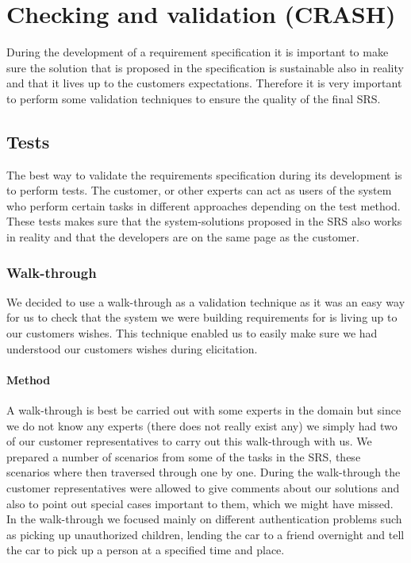 \documentclass[10pt]{article}
\begin{document}
\section{Checking and validation (CRASH)}
\noindent
During the development of a requirement specification it is important to make sure the solution that is proposed in the specification is sustainable also in reality and that it lives up to the customers expectations. Therefore it is very important to perform some validation techniques to ensure the quality of the final SRS.

\subsection{Tests}
The best way to validate the requirements specification during its development is to perform tests. The customer, or other experts can act as users of the system who perform certain tasks in different approaches depending on the test method. These tests makes sure that the system-solutions proposed in the SRS also works in reality and that the developers are on the same page as the customer.

\subsubsection{Walk-through}
We decided to use a walk-through as a validation technique as it was an easy way for us to check that the system we were building requirements for is living up to our customers wishes. This technique enabled us to easily make sure we had understood our customers wishes during elicitation.

\paragraph{Method}
\hfill \break
A walk-through is best be carried out with some experts in the domain but since we do not know any experts (there does not really exist any) we simply had two of our customer representatives to carry out this walk-through with us.
We prepared a number of scenarios from some of the tasks in the SRS, these scenarios where then traversed through one by one. During the walk-through the customer representatives were allowed to give comments about our solutions and also to point out special cases important to them, which we might have missed. In the walk-through we focused mainly on different authentication problems such as picking up unauthorized children, lending the car to a friend overnight and tell the car to pick up a person at a specified time and place.
\end{document}

